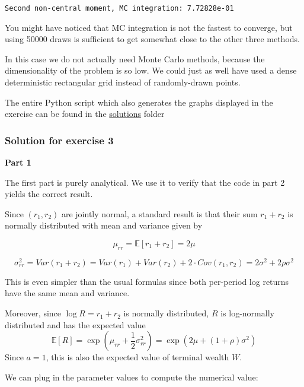 \documentclass{scrartcl}
\begin{document}
    \begin{Verbatim}[commandchars=\\\{\}]
Second non-central moment, MC integration: 7.72828e-01
    \end{Verbatim}

    You might have noticed that MC integration is not the fastest to
converge, but using 50000 draws is sufficient to get somewhat close to
the other three methods.

In this case we do not actually need Monte Carlo methods, because the
dimensionality of the problem is so low. We could just as well have used
a dense deterministic rectangular grid instead of randomly-drawn points.

The entire Python script which also generates the graphs displayed in
the exercise can be found in the
\href{../lectures/solutions/unit7}{solutions} folder

    \hypertarget{solution-for-exercise-3}{%
\subsubsection{Solution for exercise 3}\label{solution-for-exercise-3}}

\textbf{Part 1}

The first part is purely analytical. We use it to verify that the code
in part 2 yields the correct result.

Since \((r_1, r_2)\) are jointly normal, a standard result is that their
sum \(r_1 + r_2\) is normally distributed with mean and variance given
by

\[\mu_{rr} = \mathbb{E}[r_1 + r_2] = 2\mu \]

\[
\sigma^2_{rr} = Var(r_1+r_2) = Var(r_1) + Var(r_2) + 2\cdot Cov(r_1,r_2) = 2\sigma^2 + 2\rho\sigma^2 
\]

This is even simpler than the usual formulas since both per-period log
returns have the same mean and variance.

Moreover, since \(\log R = r_1 + r_2\) is normally distributed, \(R\) is
log-normally distributed and has the expected value \[
\mathbb{E}[R] = \exp\left(\mu_{rr} + \frac{1}{2}\sigma_{rr}^2 \right)
    = \exp\left(2\mu + (1+\rho) \sigma^2 \right)
\] Since \(a = 1\), this is also the expected value of terminal wealth
\(W\).

We can plug in the parameter values to compute the numerical value:
\end{document}
